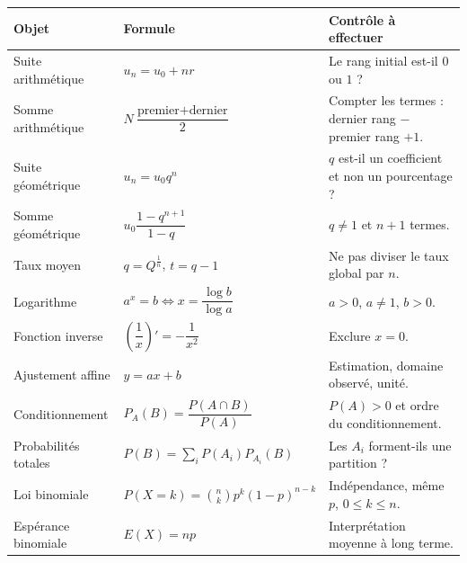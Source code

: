 \begin{longtable}{p{}p{}p{}}
\toprule
Objet & Formule & Contrôle à effectuer\\
\midrule
Suite arithmétique & $u_n=u_0+nr$ & Le rang initial est-il $0$ ou $1$ ?\\
Somme arithmétique & $N\dfrac{\text{premier}+\text{dernier}}2$ & Compter les termes : dernier rang $-$ premier rang $+1$.\\
Suite géométrique & $u_n=u_0q^n$ & $q$ est-il un coefficient et non un pourcentage ?\\
Somme géométrique & $u_0\dfrac{1-q^{n+1}}{1-q}$ & $q\neq1$ et $n+1$ termes.\\
Taux moyen & $q=Q^{\frac1n}$, $t=q-1$ & Ne pas diviser le taux global par $n$.\\
Logarithme & $a^x=b\iff x=\dfrac{\log b}{\log a}$ & $a>0$, $a\neq1$, $b>0$.\\
Fonction inverse & $\left(\dfrac1x\right)'=-\dfrac1{x^2}$ & Exclure $x=0$.\\
Ajustement affine & $y=ax+b$ & Estimation, domaine observé, unité.\\
Conditionnement & $P_A(B)=\dfrac{P(A\cap B)}{P(A)}$ & $P(A)>0$ et ordre du conditionnement.\\
Probabilités totales & $P(B)=\sum_iP(A_i)P_{A_i}(B)$ & Les $A_i$ forment-ils une partition ?\\
Loi binomiale & $P(X=k)=\binom nkp^k(1-p)^{n-k}$ & Indépendance, même $p$, $0\leq k\leq n$.\\
Espérance binomiale & $E(X)=np$ & Interprétation moyenne à long terme.\\
\bottomrule
\end{longtable}
